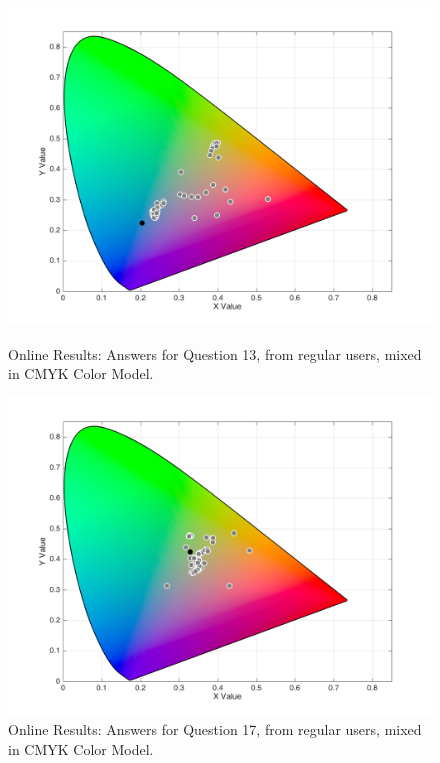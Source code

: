 \begin{figure}[!htbp]
  \centering
  \begin{minipage}{0.48\textwidth}
    \centering
    \includegraphics[width=\textwidth]{images/results/13_online_CMYKresponses.png}
    \caption[Online Results: Answers for Question 13, from regular users, mixed in CMYK Color Model.]{Online Results: Answers for Question 13, from regular users, mixed in CMYK Color Model.}
    \label{fig:onlinecmykregular_13}
  \end{minipage}\hfill
  \begin{minipage}{0.48\textwidth}
    \centering
    \includegraphics[width=\textwidth]{images/results/17_online_CMYKresponses.png}
    \caption[Online Results: Answers for Question 17, from regular users, mixed in CMYK Color Model.]{Online Results: Answers for Question 17, from regular users, mixed in CMYK Color Model.}
    \label{fig:onlinecmykregular_17}
  \end{minipage}
\end{figure}
